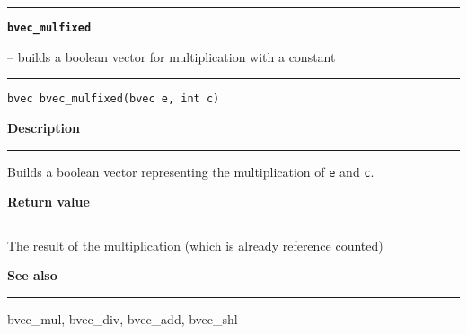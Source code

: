 \begin{minipage}{\textwidth}

\noindent\begin{minipage}{\textwidth}
\rule{\textwidth}{0.5mm}
{\tt\bf bvec\_mulfixed }
\--- builds a boolean vector for multiplication with a constant  \hspace{\fill}
\\\rule[1.5ex]{\textwidth}{0.5mm}
\end{minipage}

\noindent\begin{verbatim}
bvec bvec_mulfixed(bvec e, int c) 
\end{verbatim}

\vspace{\parsep}\noindent
{\bf Description}\\\rule[1.5ex]{\textwidth}{0.2mm}\vspace{-1.5ex}\setlength{\parindent}{1em}
Builds a boolean vector representing the multiplication
           of {\tt e} and {\tt c}. 

\setlength{\parindent}{0em}\vspace{\parsep}\vspace{\baselineskip}\noindent
{\bf Return value}\\\rule[1.5ex]{\textwidth}{0.2mm}\vspace{-1.5ex}
The result of the multiplication (which is already reference counted) 

\vspace{\parsep}\vspace{\baselineskip}\noindent
{\bf See also}\\\rule[1.5ex]{\textwidth}{0.2mm}\vspace{-1.5ex}
bvec\_mul, bvec\_div, bvec\_add, bvec\_shl 
\end{minipage}
\vspace{8ex}
